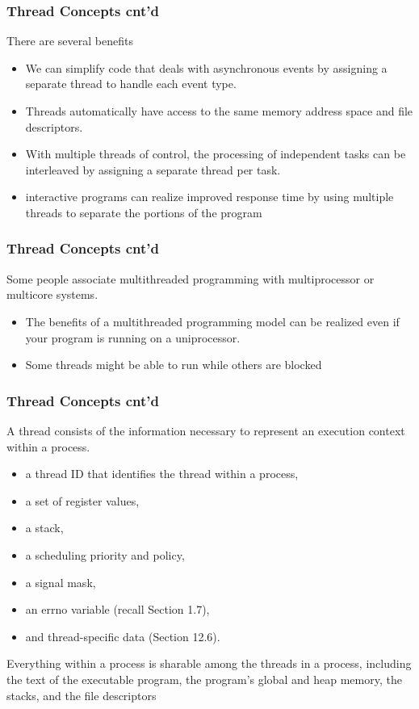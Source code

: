 \documentclass[newPxFont,sthlmFooter,nooffset]{beamer}
\begin{document}
\begin{frame}[t]
  \frametitle{Thread Concepts cnt'd}
There are several benefits
\begin{itemize}
\item We can simplify code that deals with asynchronous events by assigning a separate thread to handle each event type.
\item Threads automatically have access to the same memory address space and file descriptors.
\item  With multiple threads of control, the processing of independent tasks can be interleaved by assigning a separate thread per task.
\item  interactive programs can realize improved response time by using multiple threads to separate the portions of the program
\end{itemize}
\end{frame}



\begin{frame}[t]
  \frametitle{Thread Concepts cnt'd}
  Some people associate multithreaded programming with multiprocessor or multicore systems.
  \begin{itemize}
  \item The benefits of a multithreaded programming model can be
    realized even if your program is running on a uniprocessor.
  \item Some threads might be able to run while others are blocked
  \end{itemize}


\end{frame}



\begin{frame}[t]
  \frametitle{Thread Concepts cnt'd}
  A thread consists of the information necessary to represent an
    execution context within a process.
  \begin{itemize}
    \item  a thread ID that identifies the thread within a process,
    \item a set of register values,
    \item a stack,
    \item a scheduling priority and policy,
    \item a signal mask,
    \item an errno variable (recall Section 1.7),
    \item and thread-specific data (Section 12.6).
  \end{itemize}
Everything within a process is sharable among the threads in a process, including the text of the executable program, the program’s global and heap memory, the stacks, and the file descriptors

\end{frame}
\end{document}
